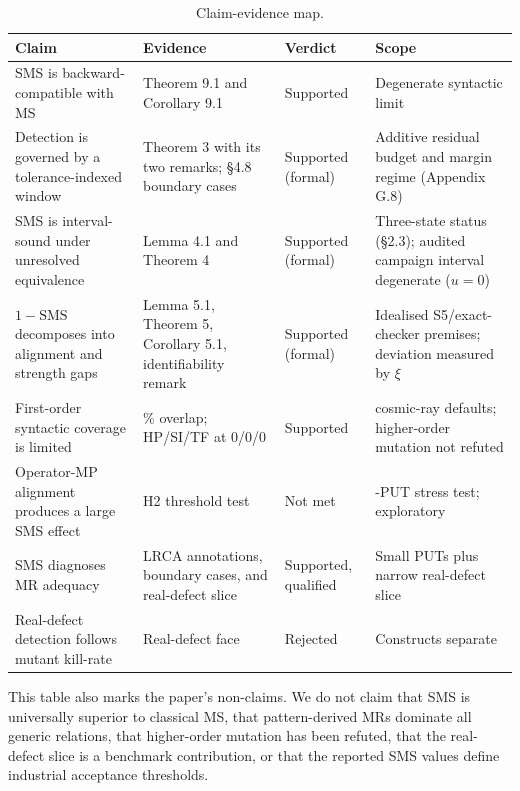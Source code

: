 \documentclass[manuscript,screen,review]{acmart}
\begin{document}
{%
\begin{longtable}[]{@{}
  >{\raggedright\arraybackslash}p{}
  >{\raggedright\arraybackslash}p{}
  >{\raggedright\arraybackslash}p{}
  >{\raggedright\arraybackslash}p{}@{}}
\caption{Claim-evidence map.}\label{tab:claim-evidence-map}\\
\toprule\noalign{}
Claim & Evidence & Verdict & Scope \\
\midrule\noalign{}
\endfirsthead
\endhead
\bottomrule\noalign{}
\endlastfoot
SMS is backward-compatible with MS & Theorem 9.1 and Corollary 9.1 &
Supported & Degenerate syntactic limit \\
Detection is governed by a tolerance-indexed window & Theorem 3 with its
two remarks; §4.8 boundary cases & Supported (formal) & Additive residual
budget and margin regime (Appendix G.8) \\
SMS is interval-sound under unresolved equivalence & Lemma 4.1 and
Theorem 4 & Supported (formal) & Three-state status (§2.3); audited
campaign interval degenerate ($u=0$) \\
$1-\mathrm{SMS}$ decomposes into alignment and strength gaps & Lemma 5.1,
Theorem 5, Corollary 5.1, identifiability remark & Supported (formal) &
Idealised S5/exact-checker premises; deviation measured by $\xi$ \\
First-order syntactic coverage is limited &
5.14\% overlap; HP/SI/TF at 0/0/0 & Supported & cosmic-ray defaults;
higher-order mutation not refuted \\
Operator-MP alignment produces a large SMS effect & H2 threshold test &
Not met & 12-PUT stress test; exploratory \\
SMS diagnoses MR adequacy & LRCA annotations,
boundary cases, and real-defect slice & Supported, qualified & Small
PUTs plus narrow real-defect slice \\
Real-defect detection follows mutant kill-rate & Real-defect face &
Rejected & Constructs separate \\
\end{longtable}
}

This table also marks the paper's non-claims. We do not claim that SMS
is universally superior to classical MS, that pattern-derived MRs
dominate all generic relations, that higher-order mutation has been
refuted, that the real-defect slice is a benchmark contribution, or that
the reported SMS values define industrial acceptance thresholds.
\end{document}
